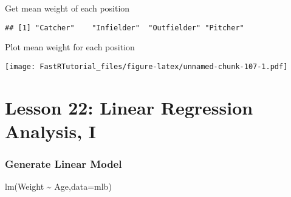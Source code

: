 \documentclass[
]{article}
\newenvironment{Shaded}{\begin{snugshade}}{\end{snugshade}}
\newcommand{\AttributeTok}[1]{\textcolor[rgb]{0.77,0.63,0.00}{#1}}
\newcommand{\CommentTok}[1]{\textcolor[rgb]{0.56,0.35,0.01}{\textit{#1}}}
\newcommand{\FunctionTok}[1]{\textcolor[rgb]{0.00,0.00,0.00}{#1}}
\newcommand{\NormalTok}[1]{#1}
\newcommand{\OtherTok}[1]{\textcolor[rgb]{0.56,0.35,0.01}{#1}}
\newcommand{\SpecialCharTok}[1]{\textcolor[rgb]{0.00,0.00,0.00}{#1}}
\newcommand{\StringTok}[1]{\textcolor[rgb]{0.31,0.60,0.02}{#1}}
\begin{document}
Get mean weight of each position

\begin{Shaded}
\end{Shaded}

\begin{verbatim}
## [1] "Catcher"    "Infielder"  "Outfielder" "Pitcher"
\end{verbatim}

Plot mean weight for each position

\begin{Shaded}
\end{Shaded}

\texttt{[image: FastRTutorial\_files/figure-latex/unnamed-chunk-107-1.pdf]}

\hypertarget{lesson-22-linear-regression-analysis-i}{%
\section{Lesson 22: Linear Regression Analysis,
I}\label{lesson-22-linear-regression-analysis-i}}

\hypertarget{generate-linear-model}{%
\subsubsection{Generate Linear Model}\label{generate-linear-model}}

\begin{Shaded}
\begin{Highlighting}[]
\FunctionTok{lm}\NormalTok{(Weight }\SpecialCharTok{\textasciitilde{}}\NormalTok{ Age,}\AttributeTok{data=}\NormalTok{mlb)}
\end{Highlighting}
\end{Shaded}
\end{document}
